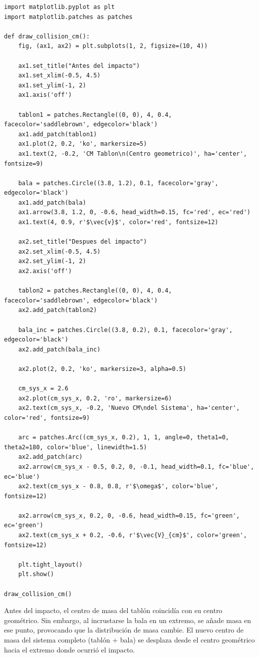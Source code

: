 \documentclass[12pt, a4paper]{article}
\begin{document}
\begin{lstlisting}
import matplotlib.pyplot as plt
import matplotlib.patches as patches

def draw_collision_cm():
    fig, (ax1, ax2) = plt.subplots(1, 2, figsize=(10, 4))
    
    ax1.set_title("Antes del impacto")
    ax1.set_xlim(-0.5, 4.5)
    ax1.set_ylim(-1, 2)
    ax1.axis('off')
    
    tablon1 = patches.Rectangle((0, 0), 4, 0.4, facecolor='saddlebrown', edgecolor='black')
    ax1.add_patch(tablon1)
    ax1.plot(2, 0.2, 'ko', markersize=5)
    ax1.text(2, -0.2, 'CM Tablon\n(Centro geometrico)', ha='center', fontsize=9)
    
    bala = patches.Circle((3.8, 1.2), 0.1, facecolor='gray', edgecolor='black')
    ax1.add_patch(bala)
    ax1.arrow(3.8, 1.2, 0, -0.6, head_width=0.15, fc='red', ec='red')
    ax1.text(4, 0.9, r'$\vec{v}$', color='red', fontsize=12)
    
    ax2.set_title("Despues del impacto")
    ax2.set_xlim(-0.5, 4.5)
    ax2.set_ylim(-1, 2)
    ax2.axis('off')
    
    tablon2 = patches.Rectangle((0, 0), 4, 0.4, facecolor='saddlebrown', edgecolor='black')
    ax2.add_patch(tablon2)
    
    bala_inc = patches.Circle((3.8, 0.2), 0.1, facecolor='gray', edgecolor='black')
    ax2.add_patch(bala_inc)
    
    ax2.plot(2, 0.2, 'ko', markersize=3, alpha=0.5) 
    
    cm_sys_x = 2.6
    ax2.plot(cm_sys_x, 0.2, 'ro', markersize=6)
    ax2.text(cm_sys_x, -0.2, 'Nuevo CM\ndel Sistema', ha='center', color='red', fontsize=9)
    
    arc = patches.Arc((cm_sys_x, 0.2), 1, 1, angle=0, theta1=0, theta2=180, color='blue', linewidth=1.5)
    ax2.add_patch(arc)
    ax2.arrow(cm_sys_x - 0.5, 0.2, 0, -0.1, head_width=0.1, fc='blue', ec='blue')
    ax2.text(cm_sys_x - 0.8, 0.8, r'$\omega$', color='blue', fontsize=12)
    
    ax2.arrow(cm_sys_x, 0.2, 0, -0.6, head_width=0.15, fc='green', ec='green')
    ax2.text(cm_sys_x + 0.2, -0.6, r'$\vec{V}_{cm}$', color='green', fontsize=12)

    plt.tight_layout()
    plt.show()

draw_collision_cm()
\end{lstlisting}

Antes del impacto, el centro de masa del tablón coincidía con su centro geométrico. Sin embargo, al incrustarse la bala en un extremo, se añade masa en ese punto, provocando que la distribución de masa cambie. El nuevo centro de masa del sistema completo (tablón + bala) se desplaza desde el centro geométrico hacia el extremo donde ocurrió el impacto. 
\end{document}
